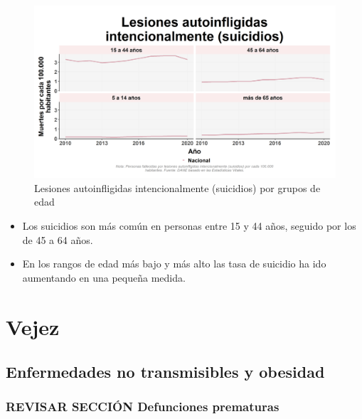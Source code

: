     \begin{figure}[H]
        \caption{Lesiones autoinfligidas intencionalmente (suicidios) por grupos de edad \label{map_result_2} }
        \begin{center}
        \includegraphics[width=\textwidth,keepaspectratio]{img/var_295_trend.png}
        \end{center}
    \end{figure}
            \begin{itemize}
                \item Los suicidios son más común en personas entre 15 y 44 años, seguido por los de 45 a 64 años.
                \item En los rangos de edad más bajo y más alto las tasa de suicidio ha ido aumentando en una pequeña medida.
                \end{itemize}

\section{Vejez}
    \subsection{Enfermedades no transmisibles y obesidad}
        \subsubsection{REVISAR SECCIÓN Defunciones prematuras}

